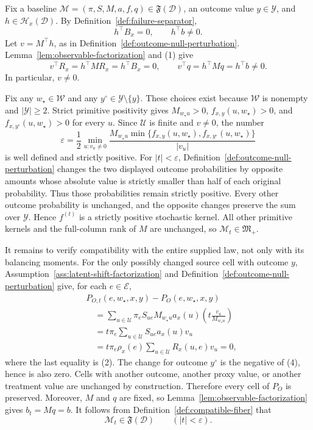 Fix a baseline \(\mathcal M=(\pi,S,M,a,f,q)\in\mathfrak F(\mathcal D)\), an outcome value \(y\in\mathcal Y\), and \(h\in\mathcal H_x(\mathcal D)\). By Definition~\ref{def:failure-separator},
\[
h^{\top}B_x=0,\qquad h^{\top}b\ne0.
\tag{1}
\]
Let \(v=M^{\top}h\), as in Definition~\ref{def:outcome-null-perturbation}. Lemma~\ref{lem:observable-factorization} and (1) give
\[
v^{\top}R_x=h^{\top}MR_x=h^{\top}B_x=0,
\qquad
v^{\top}q=h^{\top}Mq=h^{\top}b\ne0.
\tag{2}
\]
In particular, \(v\ne0\).

Fix any \(w_{\star}\in\mathcal W\) and any \(y^{\circ}\in\mathcal Y\setminus\{y\}\). These choices exist because \(\mathcal W\) is nonempty and \(\lvert\mathcal Y\rvert\ge2\). Strict primitive positivity gives \(M_{w_{\star}u}>0\), \(f_{x,y}(u,w_{\star})>0\), and \(f_{x,y^{\circ}}(u,w_{\star})>0\) for every \(u\). Since \(\mathcal U\) is finite and \(v\ne0\), the number
\[
\varepsilon
=\frac12\min_{u:v_u\ne0}
\frac{M_{w_{\star}u}\min\{f_{x,y}(u,w_{\star}),
f_{x,y^{\circ}}(u,w_{\star})\}}{|v_u|}
\tag{3}
\]
is well defined and strictly positive. For \(|t|<\varepsilon\), Definition~\ref{def:outcome-null-perturbation} changes the two displayed outcome probabilities by opposite amounts whose absolute value is strictly smaller than half of each original probability. Thus those probabilities remain strictly positive. Every other outcome probability is unchanged, and the opposite changes preserve the sum over \(\mathcal Y\). Hence \(f^{(t)}\) is a strictly positive stochastic kernel. All other primitive kernels and the full-column rank of \(M\) are unchanged, so \(\mathcal M_t\in\mathfrak M_{+}\).

It remains to verify compatibility with the entire supplied law, not only with its balancing moments. For the only possibly changed source cell with outcome \(y\), Assumption~\ref{ass:latent-shift-factorization} and Definition~\ref{def:outcome-null-perturbation} give, for each \(e\in\mathcal E\),
\[
\begin{aligned}
&P_{O,t}(e,w_{\star},x,y)-P_O(e,w_{\star},x,y)\\
&\quad=\sum_{u\in\mathcal U}\pi_eS_{ue}M_{w_{\star}u}a_x(u)
\left(t\frac{v_u}{M_{w_{\star}u}}\right)\\
&\quad=t\pi_e\sum_{u\in\mathcal U}S_{ue}a_x(u)v_u\\
&\quad=t\pi_e\rho_x(e)\sum_{u\in\mathcal U}R_x(u,e)v_u
=0,
\end{aligned}
\tag{4}
\]
where the last equality is (2). The change for outcome \(y^{\circ}\) is the negative of (4), hence is also zero. Cells with another outcome, another proxy value, or another treatment value are unchanged by construction. Therefore every cell of \(P_O\) is preserved. Moreover, \(M\) and \(q\) are fixed, so Lemma~\ref{lem:observable-factorization} gives \(b_t=Mq=b\). It follows from Definition~\ref{def:compatible-fiber} that
\[
\mathcal M_t\in\mathfrak F(\mathcal D)
\qquad (|t|<\varepsilon).
\tag{5}
\]

